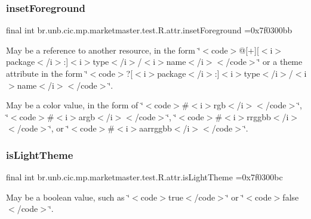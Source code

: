 \subsubsection{\texorpdfstring{inset\+Foreground}{insetForeground}}
{\footnotesize\ttfamily final int br.\+unb.\+cic.\+mp.\+marketmaster.\+test.\+R.\+attr.\+inset\+Foreground =0x7f0300bb\hspace{0.3cm}{\ttfamily [static]}}

May be a reference to another resource, in the form \char`\"{}$<$code$>$@\mbox{[}+\mbox{]}\mbox{[}$<$i$>$package$<$/i$>$\+:\mbox{]}$<$i$>$type$<$/i$>$/$<$i$>$name$<$/i$>$$<$/code$>$\char`\"{} or a theme attribute in the form \char`\"{}$<$code$>$?\mbox{[}$<$i$>$package$<$/i$>$\+:\mbox{]}$<$i$>$type$<$/i$>$/$<$i$>$name$<$/i$>$$<$/code$>$\char`\"{}. 

May be a color value, in the form of \char`\"{}$<$code$>$\#$<$i$>$rgb$<$/i$>$$<$/code$>$\char`\"{}, \char`\"{}$<$code$>$\#$<$i$>$argb$<$/i$>$$<$/code$>$\char`\"{}, \char`\"{}$<$code$>$\#$<$i$>$rrggbb$<$/i$>$$<$/code$>$\char`\"{}, or \char`\"{}$<$code$>$\#$<$i$>$aarrggbb$<$/i$>$$<$/code$>$\char`\"{}. \mbox{\label{classbr_1_1unb_1_1cic_1_1mp_1_1marketmaster_1_1test_1_1R_1_1attr_a1c99ea647a8a2dfe4c4a8707286552df}} 
\subsubsection{\texorpdfstring{is\+Light\+Theme}{isLightTheme}}
{\footnotesize\ttfamily final int br.\+unb.\+cic.\+mp.\+marketmaster.\+test.\+R.\+attr.\+is\+Light\+Theme =0x7f0300bc\hspace{0.3cm}{\ttfamily [static]}}

May be a boolean value, such as \char`\"{}$<$code$>$true$<$/code$>$\char`\"{} or \char`\"{}$<$code$>$false$<$/code$>$\char`\"{}. \mbox{\label{classbr_1_1unb_1_1cic_1_1mp_1_1marketmaster_1_1test_1_1R_1_1attr_ae54fb2d84f6cf157cefddfda3b23531e}} 
